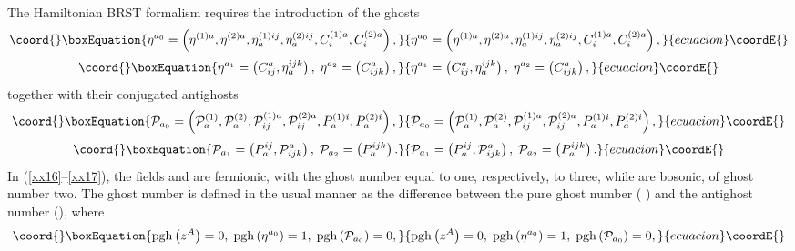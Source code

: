 \documentclass[a4paper,12pt]{article}
\begin{document}
The Hamiltonian BRST formalism requires the introduction of the ghosts 
\begin{equation}\coord{}\boxEquation{
\eta ^{a_{0}}=\left( \eta ^{(1)a},\eta ^{(2)a},\eta _{a}^{(1)ij},\eta
_{a}^{(2)ij},C_{i}^{(1)a},C_{i}^{(2)a}\right) ,  \label{xx16}
}{
\eta ^{a_{0}}=\left( \eta ^{(1)a},\eta ^{(2)a},\eta _{a}^{(1)ij},\eta
_{a}^{(2)ij},C_{i}^{(1)a},C_{i}^{(2)a}\right) ,  }{ecuacion}\coordE{}\end{equation}
\begin{equation}\coord{}\boxEquation{
\eta ^{a_{1}}=\left( C_{ij}^{a},\eta _{a}^{ijk}\right) ,\;\eta
^{a_{2}}=\left( C_{ijk}^{a}\right) ,  \label{xx17}
}{
\eta ^{a_{1}}=\left( C_{ij}^{a},\eta _{a}^{ijk}\right) ,\;\eta
^{a_{2}}=\left( C_{ijk}^{a}\right) ,  }{ecuacion}\coordE{}\end{equation}
together with their conjugated antighosts 
\begin{equation}\coord{}\boxEquation{
\mathcal{P}_{a_{0}}=\left( \mathcal{P}_{a}^{(1)},\mathcal{P}_{a}^{(2)},
\mathcal{P}_{ij}^{(1)a},\mathcal{P}_{ij}^{(2)a},P_{a}^{(1)i},P_{a}^{(2)i}
\right) ,  \label{xx18}
}{
\mathcal{P}_{a_{0}}=\left( \mathcal{P}_{a}^{(1)},\mathcal{P}_{a}^{(2)},
\mathcal{P}_{ij}^{(1)a},\mathcal{P}_{ij}^{(2)a},P_{a}^{(1)i},P_{a}^{(2)i}
\right) ,  }{ecuacion}\coordE{}\end{equation}
\begin{equation}\coord{}\boxEquation{
\mathcal{P}_{a_{1}}=\left( P_{a}^{ij},\mathcal{P}_{ijk}^{a}\right) ,\;
\mathcal{P}_{a_{2}}=\left( P_{a}^{ijk}\right) .  \label{xx19}
}{
\mathcal{P}_{a_{1}}=\left( P_{a}^{ij},\mathcal{P}_{ijk}^{a}\right) ,\;
\mathcal{P}_{a_{2}}=\left( P_{a}^{ijk}\right) .  }{ecuacion}\coordE{}\end{equation}
In (\ref{xx16}--\ref{xx17}), the fields \coordHE{} and \coordHE{}
are fermionic, with the ghost number equal to one, respectively, to three,
while \coordHE{} are bosonic, of ghost number two. The ghost number is
defined in the usual manner as the difference between the pure ghost number (%
\coordHE{}) and the antighost number (\coordHE{}), where 
\begin{equation}\coord{}\boxEquation{
\mathrm{pgh}\left( z^{A}\right) =0,\;\mathrm{pgh}\left( \eta ^{a_{0}}\right)
=1,\;\mathrm{pgh}\left( \mathcal{P}_{a_{0}}\right) =0,  \label{xx20}
}{
\mathrm{pgh}\left( z^{A}\right) =0,\;\mathrm{pgh}\left( \eta ^{a_{0}}\right)
=1,\;\mathrm{pgh}\left( \mathcal{P}_{a_{0}}\right) =0,  }{ecuacion}\coordE{}\end{equation}
\end{document}

